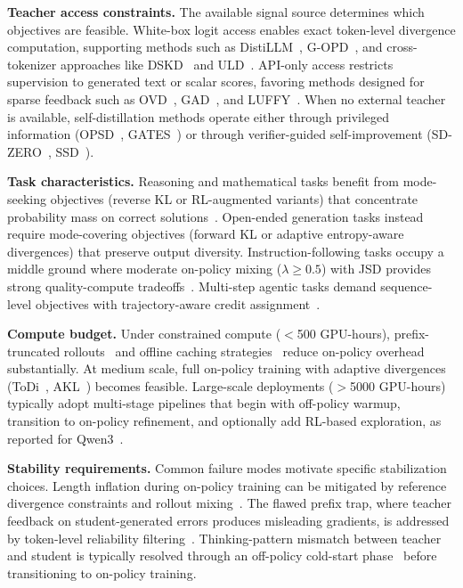 \documentclass{article} %
\begin{document}
\textbf{Teacher access constraints.} The available signal source determines which objectives are feasible. White-box logit access enables exact token-level divergence computation, supporting methods such as DistiLLM~\citep{2402.03898}, G-OPD~\citep{2602.12125}, and cross-tokenizer approaches like DSKD~\citep{2504.11426} and ULD~\citep{2402.12030}. API-only access restricts supervision to generated text or scalar scores, favoring methods designed for sparse feedback such as OVD~\citep{2601.21968}, GAD~\citep{2511.10643}, and LUFFY~\citep{2504.14945}. When no external teacher is available, self-distillation methods operate either through privileged information (OPSD~\citep{2601.18734}, GATES~\citep{2602.20574}) or through verifier-guided self-improvement (SD-ZERO~\citep{he2026selfdistillation}, SSD~\citep{zhang2026embarrassingly}).

\textbf{Task characteristics.} Reasoning and mathematical tasks benefit from mode-seeking objectives (reverse KL or RL-augmented variants) that concentrate probability mass on correct solutions~\citep{2306.08543,2602.12125,2506.02208}. Open-ended generation tasks instead require mode-covering objectives (forward KL or adaptive entropy-aware divergences) that preserve output diversity. Instruction-following tasks occupy a middle ground where moderate on-policy mixing ($\lambda \geq 0.5$) with JSD provides strong quality-compute tradeoffs~\citep{2306.13649}. Multi-step agentic tasks demand sequence-level objectives with trajectory-aware credit assignment~\citep{2509.14257,2602.22495}.

\textbf{Compute budget.} Under constrained compute ($<$500 GPU-hours), prefix-truncated rollouts~\citep{2602.15260} and offline caching strategies~\citep{wu2026lightning} reduce on-policy overhead substantially. At medium scale, full on-policy training with adaptive divergences (ToDi~\citep{2505.16297}, AKL~\citep{2404.02657}) becomes feasible. Large-scale deployments ($>$5000 GPU-hours) typically adopt multi-stage pipelines that begin with off-policy warmup, transition to on-policy refinement, and optionally add RL-based exploration, as reported for Qwen3~\citep{2505.09388}.

\textbf{Stability requirements.} Common failure modes motivate specific stabilization choices. Length inflation during on-policy training can be mitigated by reference divergence constraints and rollout mixing~\citep{luo2026demystifying}. The flawed prefix trap, where teacher feedback on student-generated errors produces misleading gradients, is addressed by token-level reliability filtering~\citep{xu2026tip,zheng2026scope}. Thinking-pattern mismatch between teacher and student is typically resolved through an off-policy cold-start phase~\citep{li2026rethinking} before transitioning to on-policy training.
\end{document}
